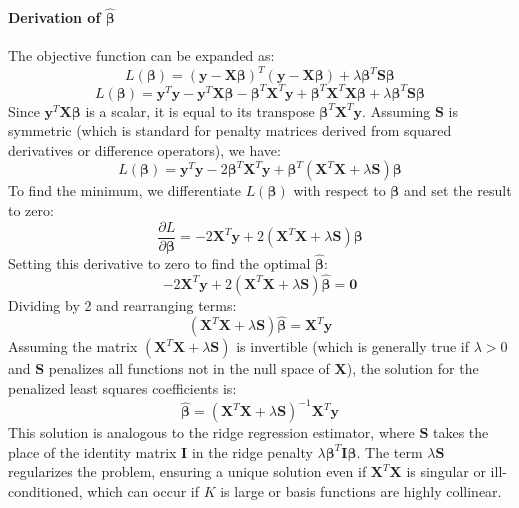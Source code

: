 \documentclass[11pt, a4paper]{article}
\begin{document}
\paragraph{Derivation of $\hat{\boldsymbol{\beta}}$}
The objective function can be expanded as:
\[ L(\boldsymbol{\beta}) = (\mathbf{y} - \mathbf{X}\boldsymbol{\beta})^T(\mathbf{y} - \mathbf{X}\boldsymbol{\beta}) + \lambda \boldsymbol{\beta}^T \mathbf{S} \boldsymbol{\beta} \]
\[ L(\boldsymbol{\beta}) = \mathbf{y}^T\mathbf{y} - \mathbf{y}^T\mathbf{X}\boldsymbol{\beta} - \boldsymbol{\beta}^T\mathbf{X}^T\mathbf{y} + \boldsymbol{\beta}^T\mathbf{X}^T\mathbf{X}\boldsymbol{\beta} + \lambda \boldsymbol{\beta}^T \mathbf{S} \boldsymbol{\beta} \]
Since $\mathbf{y}^T\mathbf{X}\boldsymbol{\beta}$ is a scalar, it is equal to its transpose $\boldsymbol{\beta}^T\mathbf{X}^T\mathbf{y}$. Assuming $\mathbf{S}$ is symmetric (which is standard for penalty matrices derived from squared derivatives or difference operators), we have:
\[ L(\boldsymbol{\beta}) = \mathbf{y}^T\mathbf{y} - 2\boldsymbol{\beta}^T\mathbf{X}^T\mathbf{y} + \boldsymbol{\beta}^T(\mathbf{X}^T\mathbf{X} + \lambda\mathbf{S})\boldsymbol{\beta} \]
To find the minimum, we differentiate $L(\boldsymbol{\beta})$ with respect to $\boldsymbol{\beta}$ and set the result to zero:
\[ \frac{\partial L}{\partial \boldsymbol{\beta}} = -2\mathbf{X}^T\mathbf{y} + 2(\mathbf{X}^T\mathbf{X} + \lambda\mathbf{S})\boldsymbol{\beta} \]
Setting this derivative to zero to find the optimal $\hat{\boldsymbol{\beta}}$:
\[ -2\mathbf{X}^T\mathbf{y} + 2(\mathbf{X}^T\mathbf{X} + \lambda\mathbf{S})\hat{\boldsymbol{\beta}} = \mathbf{0} \]
Dividing by 2 and rearranging terms:
\[ (\mathbf{X}^T\mathbf{X} + \lambda\mathbf{S})\hat{\boldsymbol{\beta}} = \mathbf{X}^T\mathbf{y} \]
Assuming the matrix $(\mathbf{X}^T\mathbf{X} + \lambda\mathbf{S})$ is invertible (which is generally true if $\lambda > 0$ and $\mathbf{S}$ penalizes all functions not in the null space of $\mathbf{X}$), the solution for the penalized least squares coefficients is:
\[ \hat{\boldsymbol{\beta}} = (\mathbf{X}^T\mathbf{X} + \lambda\mathbf{S})^{-1}\mathbf{X}^T\mathbf{y} \]
This solution is analogous to the ridge regression estimator, where $\mathbf{S}$ takes the place of the identity matrix $\mathbf{I}$ in the ridge penalty $\lambda \boldsymbol{\beta}^T\mathbf{I}\boldsymbol{\beta}$. The term $\lambda\mathbf{S}$ regularizes the problem, ensuring a unique solution even if $\mathbf{X}^T\mathbf{X}$ is singular or ill-conditioned, which can occur if $K$ is large or basis functions are highly collinear.
\end{document}
